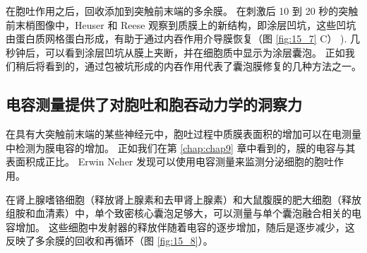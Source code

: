 在胞吐作用之后，回收添加到突触前末端的多余膜。 
在刺激后 10 到 20 秒的突触前末梢图像中，Heuser 和 Reese 观察到质膜上的新结构，即涂层凹坑，这些凹坑由蛋白质网格蛋白形成，有助于通过内吞作用介导膜恢复（图 \ref{fig:15_7} C） ). 几秒钟后，可以看到涂层凹坑从膜上夹断，并在细胞质中显示为涂层囊泡。 
正如我们稍后将看到的，通过包被坑形成的内吞作用代表了囊泡膜修复的几种方法之一。



\subsection{电容测量提供了对胞吐和胞吞动力学的洞察力}

在具有大突触前末端的某些神经元中，胞吐过程中质膜表面积的增加可以在电测量中检测为膜电容的增加。 
正如我们在第 \ref{chap:chap9} 章中看到的，膜的电容与其表面积成正比。 
Erwin Neher 发现可以使用电容测量来监测分泌细胞的胞吐作用。


在肾上腺嗜铬细胞（释放肾上腺素和去甲肾上腺素）和大鼠腹膜的肥大细胞（释放组胺和血清素）中，单个致密核心囊泡足够大，可以测量与单个囊泡融合相关的电容增加。 
这些细胞中发射器的释放伴随着电容的逐步增加，随后是逐步减少，这反映了多余膜的回收和再循环（图 \ref{fig:15_8}）。


